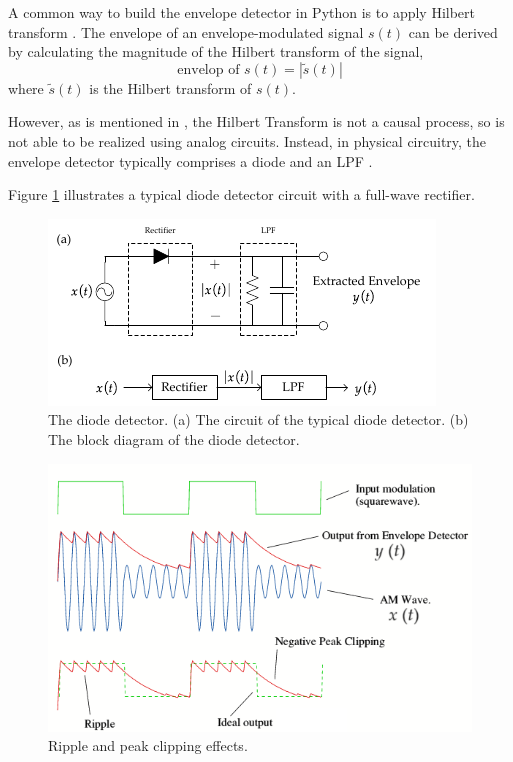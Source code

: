 \documentclass[../ECE459FinalProjectReport.tex]{subfiles}
\begin{document}
A common way to build the envelope detector in Python is to apply Hilbert transform \cite{ulrichEnvelopeCalculationHilbert2006, XiXiaoShengPythonTiQuXinHaoDeBaoLuoGet2023}. The envelope of an envelope-modulated signal $s\left(t\right)$ can be derived by calculating the magnitude of the Hilbert transform of the signal,
\begin{equation}
    \text{envelop of $s\left(t\right)$} = \left| \tilde{s}\left(t\right) \right|
\end{equation}
where $\tilde{s}(t)$ is the Hilbert transform of $s\left(t\right)$.

However, as is mentioned in \cite[p. 428]{kudekiAnalogSignalsSystems2009}, the Hilbert Transform is not a causal process, so is not able to be realized using analog circuits. Instead, in physical circuitry, the envelope detector typically comprises a diode and an LPF \cite{AnalogCommunicationAM}.

Figure \ref{fig:envelope} illustrates a typical diode detector circuit with a full-wave rectifier. 

\cite[pp. 111--112]{haykinIntroductionAnalogDigital2007}

\begin{figure}[tb]
    \centering
    \includegraphics[scale=1.8]{plots/diode_detector.pdf}
    \caption{The diode detector. (a) The circuit of the typical diode detector. (b) The block diagram of the diode detector.}
    \label{fig:envelope}
\end{figure}
\begin{figure}[tb]
    \centering
    \includegraphics[width=0.6\linewidth]{plots/envelope_ripple.png}
    \caption{Ripple and peak clipping effects. \cite[Fig. 9.3]{lesurfEnvelopeDetector}}
\end{figure}
\end{document}

